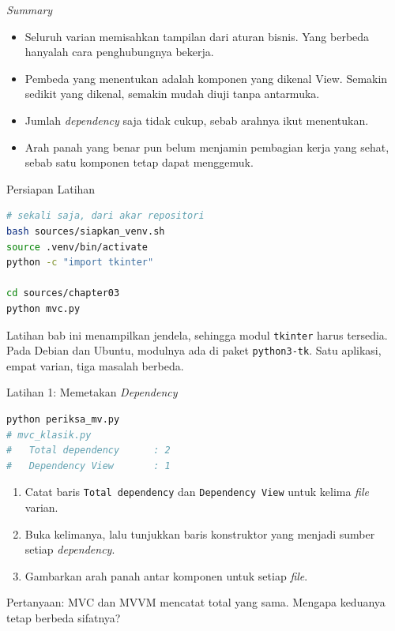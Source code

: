 \documentclass[aspectratio=169, table, 12pt]{beamer}
\begin{document}
\begin{frame}{{\Large \textit{Summary}}}
  \vspace{12pt}
  \begin{itemize}
    \item Seluruh varian memisahkan tampilan dari aturan bisnis. Yang berbeda
          hanyalah cara penghubungnya bekerja.
    \item Pembeda yang menentukan adalah komponen yang dikenal View. Semakin
          sedikit yang dikenal, semakin mudah diuji tanpa antarmuka.
    \item Jumlah \textit{dependency} saja tidak cukup, sebab arahnya ikut
          menentukan.
    \item Arah panah yang benar pun belum menjamin pembagian kerja yang sehat,
          sebab satu komponen tetap dapat menggemuk.
  \end{itemize}
\end{frame}

\begin{frame}[fragile]{{\Large Persiapan Latihan}}
  \vspace{5pt}
\begin{lstlisting}[language=bash]
# sekali saja, dari akar repositori
bash sources/siapkan_venv.sh
source .venv/bin/activate
python -c "import tkinter"

cd sources/chapter03
python mvc.py
\end{lstlisting}

  \vspace{5pt}
  {\small Latihan bab ini menampilkan jendela, sehingga modul \texttt{tkinter}
  harus tersedia. Pada Debian dan Ubuntu, modulnya ada di paket
  \texttt{python3-tk}. Satu aplikasi, empat varian, tiga masalah berbeda.}
\end{frame}

\begin{frame}[fragile]{{\Large Latihan 1: Memetakan \textit{Dependency}}}
  \vspace{3pt}
\begin{lstlisting}[language=bash, basicstyle=\ttfamily\tiny]
python periksa_mv.py
# mvc_klasik.py
#   Total dependency      : 2
#   Dependency View       : 1
\end{lstlisting}

  \vspace{3pt}
  \begin{enumerate}
    \item Catat baris \texttt{Total dependency} dan \texttt{Dependency View}
          untuk kelima \textit{file} varian.
    \item Buka kelimanya, lalu tunjukkan baris konstruktor yang menjadi
          sumber setiap \textit{dependency}.
    \item Gambarkan arah panah antar komponen untuk setiap \textit{file}.
  \end{enumerate}

  \vspace{3pt}
  {\small Pertanyaan: MVC dan MVVM mencatat total yang sama. Mengapa keduanya
  tetap berbeda sifatnya?}
\end{frame}
\end{document}
